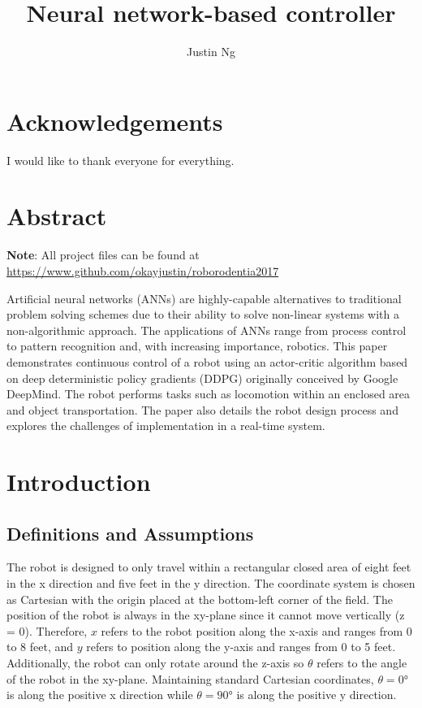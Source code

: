 \documentclass[12pt,letterpaper,titlepage]{report}
\title{Neural network-based controller}
\author{Justin Ng}
\begin{document}

\newpage
{}
\tableofcontents
\listoffigures
\listoftables


\chapter*{Acknowledgements}
I would like to thank everyone for everything.


\chapter*{Abstract}
\textbf{Note}: All project files can be found at \url{https://www.github.com/okayjustin/roborodentia2017} \

Artificial neural networks (ANNs) are highly-capable alternatives to traditional problem solving schemes due to their ability to solve non-linear systems with a non-algorithmic approach. The applications of ANNs range from process control to pattern recognition and, with increasing importance, robotics. This paper demonstrates continuous control of a robot using an actor-critic algorithm based on deep deterministic policy gradients (DDPG) originally conceived by Google DeepMind. The robot performs tasks such as locomotion within an enclosed area and object transportation. The paper also details the robot design process and explores the challenges of implementation in a real-time system.


\chapter{Introduction}
\section{Definitions and Assumptions}
The robot is designed to only travel within a rectangular closed area of eight feet in the x direction and five feet in the y direction. The coordinate system is chosen as Cartesian with the origin placed at the bottom-left corner of the field. The position of the robot is always in the xy-plane since it cannot move vertically (z = 0). Therefore, $x$ refers to the robot position along the x-axis and ranges from 0 to 8 feet, and $y$ refers to position along the y-axis and ranges from 0 to 5 feet. Additionally, the robot can only rotate around the z-axis so $\theta$ refers to the angle of the robot in the xy-plane. Maintaining standard Cartesian coordinates, $\theta=\ang{0}$ is along the positive x direction while $\theta=\ang{90}$ is along the positive y direction.
\end{document}
